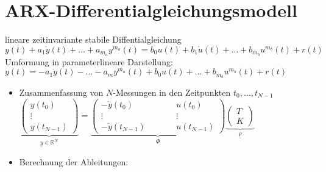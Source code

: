 \documentclass[ngerman]{tudscrreprt}
\begin{document}
\section{ARX-Differentialgleichungsmodell}
lineare zeitinvariante stabile Diffentialgleichung\\
$y(t) + a_1 \dot y(t) + \dots + a_{m_a}y^{m_a} (t) = b_0 u(t)+b_1 \dot u(t) + \dots + b_{m_b} u^{m_b} (t) + r(t)$\\
Umformung in parameterlineare Darstellung: \\
$y(t) = -a_1 \dot y(t) - \dots - a_m y^{m_a} (t) + b_0 u(t) +\dots + b_{m_b} u^{m_b} (t) + r(t)$\\
\begin{itemize}
\item Zusammenfassung von $N$-Messungen in den Zeitpunkten $t_0,\dots , t_{N-1}$\\
$ \underbrace{\begin{pmatrix}y(t_0)\\ \vdots\\ y(t_{N-1}) \end{pmatrix}}_{\underline y \in \mathbb{R}^N} = \underbrace{
\begin{pmatrix}
-\dot y(t_0) &\qquad& u(t_0)\\
\vdots& \qquad& \vdots\\
-\dot y(t_{N-1}) &\qquad& u(t_{N-1})
\end{pmatrix} }_{\Phi} \underbrace{\begin{pmatrix} T \\ K \end{pmatrix}}_{\underline \rho}
$ 
\item Berechnung der Ableitungen: 
\end{itemize}
\end{document}
